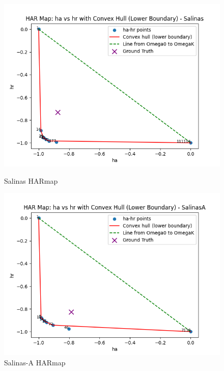\begin{figure}[htbp]
    \centering
    \begin{minipage}{0.45\textwidth}
        \centering
        \includegraphics[width=\linewidth]{figures/Salinas_HARmap.png}
        \caption{Salinas HARmap}
        \label{fig:salinas_har}
    \end{minipage}\hfill
    \begin{minipage}{0.45\textwidth}
        \centering
        \includegraphics[width=\linewidth]{figures/SalinasA_HARmap.png}
        \caption{Salinas-A HARmap}
        \label{fig:salinasa_har}
    \end{minipage}
\end{figure}

